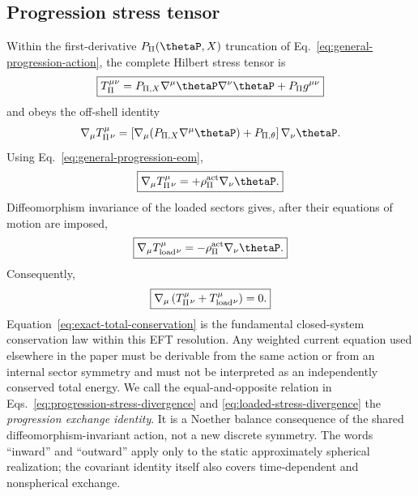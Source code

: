 \documentclass[12pt]{article}
\begin{document}
\subsection{Progression stress tensor}

Within the first-derivative \(P_\Pi(\thetaP,X)\) truncation of Eq.~\eqref{eq:general-progression-action}, the complete Hilbert stress tensor is
\begin{equation}
    \boxed{
    T_\Pi^{\mu\nu}
    =P_{\Pi,X}\nabla^\mu\thetaP\nabla^\nu\thetaP
    +P_\Pi g^{\mu\nu}}
    \label{eq:full-progression-stress}
\end{equation}
and obeys the off-shell identity
\begin{equation}
    \nabla_\mu T_\Pi^{\mu}{}_{\nu}
    =\left[
      \nabla_\mu(P_{\Pi,X}\nabla^\mu\thetaP)
      +P_{\Pi,\theta}
      \right]\nabla_\nu\thetaP .
    \label{eq:progression-stress-divergence-offshell}
\end{equation}
Using Eq.~\eqref{eq:general-progression-eom},
\begin{equation}
    \boxed{
    \nabla_\mu T_\Pi^{\mu}{}_{\nu}
    =+\rho_\Pi^{\rm act}\nabla_\nu\thetaP .}
    \label{eq:progression-stress-divergence}
\end{equation}
Diffeomorphism invariance of the loaded sectors gives, after their equations of motion are imposed,
\begin{equation}
    \boxed{
    \nabla_\mu T_{\rm load}^{\mu}{}_{\nu}
    =-\rho_\Pi^{\rm act}\nabla_\nu\thetaP .}
    \label{eq:loaded-stress-divergence}
\end{equation}
Consequently,
\begin{equation}
    \boxed{
    \nabla_\mu\left(T_\Pi^{\mu}{}_{\nu}
    +T_{\rm load}^{\mu}{}_{\nu}\right)=0 .}
    \label{eq:exact-total-conservation}
\end{equation}
Equation~\eqref{eq:exact-total-conservation} is the fundamental closed-system conservation law within this EFT resolution.  Any weighted current equation used elsewhere in the paper must be derivable from the same action or from an internal sector symmetry and must not be interpreted as an independently conserved total energy.  We call the equal-and-opposite relation in Eqs.~\eqref{eq:progression-stress-divergence} and \eqref{eq:loaded-stress-divergence} the \emph{progression exchange identity}.  It is a Noether balance consequence of the shared diffeomorphism-invariant action, not a new discrete symmetry.  The words ``inward'' and ``outward'' apply only to the static approximately spherical realization; the covariant identity itself also covers time-dependent and nonspherical exchange.
\end{document}
